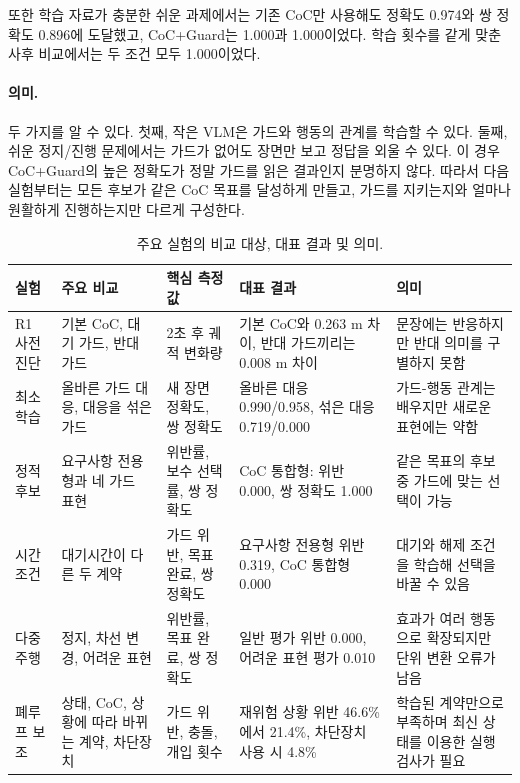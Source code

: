 또한 학습 자료가 충분한 쉬운 과제에서는 기존 CoC만 사용해도 정확도 0.974와 쌍 정확도 0.896에 도달했고, CoC+Guard는 1.000과 1.000이었다. 학습 횟수를 같게 맞춘 사후 비교에서는 두 조건 모두 1.000이었다.

\paragraph{의미.}
두 가지를 알 수 있다. 첫째, 작은 VLM은 가드와 행동의 관계를 학습할 수 있다. 둘째, 쉬운 정지/진행 문제에서는 가드가 없어도 장면만 보고 정답을 외울 수 있다. 이 경우 CoC+Guard의 높은 정확도가 정말 가드를 읽은 결과인지 분명하지 않다. 따라서 다음 실험부터는 모든 후보가 같은 CoC 목표를 달성하게 만들고, 가드를 지키는지와 얼마나 원활하게 진행하는지만 다르게 구성한다.

\begin{table}[!t]
\centering
\caption{주요 실험의 비교 대상, 대표 결과 및 의미.}
\label{tab:suite}
\scriptsize
\begin{tabularx}{\textwidth}{L{0.14\textwidth}L{0.19\textwidth}L{0.20\textwidth}L{0.20\textwidth}Y}
\toprule
실험 & 주요 비교 & 핵심 측정값 & 대표 결과 & 의미 \\
\midrule
R1 사전 진단 & 기본 CoC, 대기 가드, 반대 가드 & 2초 후 궤적 변화량 & 기본 CoC와 0.263 m 차이, 반대 가드끼리는 0.008 m 차이 & 문장에는 반응하지만 반대 의미를 구별하지 못함 \\
최소 학습 & 올바른 가드 대응, 대응을 섞은 가드 & 새 장면 정확도, 쌍 정확도 & 올바른 대응 0.990/0.958, 섞은 대응 0.719/0.000 & 가드-행동 관계는 배우지만 새로운 표현에는 약함 \\
정적 후보 & 요구사항 전용형과 네 가드 표현 & 위반률, 보수 선택률, 쌍 정확도 & CoC 통합형: 위반 0.000, 쌍 정확도 1.000 & 같은 목표의 후보 중 가드에 맞는 선택이 가능 \\
시간 조건 & 대기시간이 다른 두 계약 & 가드 위반, 목표 완료, 쌍 정확도 & 요구사항 전용형 위반 0.319, CoC 통합형 0.000 & 대기와 해제 조건을 학습해 선택을 바꿀 수 있음 \\
다중 주행 & 정지, 차선 변경, 어려운 표현 & 위반률, 목표 완료, 쌍 정확도 & 일반 평가 위반 0.000, 어려운 표현 평가 0.010 & 효과가 여러 행동으로 확장되지만 단위 변환 오류가 남음 \\
폐루프 보조 & 상태, CoC, 상황에 따라 바뀌는 계약, 차단장치 & 가드 위반, 충돌, 개입 횟수 & 재위험 상황 위반 46.6\%에서 21.4\%, 차단장치 사용 시 4.8\% & 학습된 계약만으로 부족하며 최신 상태를 이용한 실행 검사가 필요 \\
\bottomrule
\end{tabularx}
\end{table}

